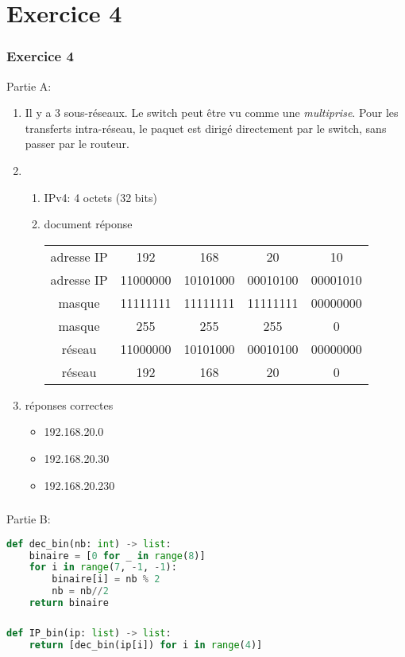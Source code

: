 \documentclass[svgnames,11pt]{beamer}
\begin{document}
\section{Exercice 4}
\begin{frame}
    \frametitle{Exercice 4}
Partie A:
\begin{enumerate}
    \item Il y a 3 sous-réseaux. Le switch peut être vu comme une \emph{multiprise}. Pour les transferts intra-réseau, le paquet est dirigé directement par le switch, sans passer par le routeur. 
    \item \begin{enumerate}
        \item IPv4: 4 octets (32 bits)
        \item document réponse
        \begin{center}
            \begin{tabular}{ccccc}
                adresse IP & 192      & 168      & 20       & 10        \\
                adresse IP & 11000000 & 10101000 & 00010100 & 00001010 \\
                masque     & 11111111 & 11111111 & 11111111 & 00000000 \\
                masque &255&255&255&0\\
                réseau     & 11000000 & 10101000 & 00010100 & 00000000 \\
                réseau&192&168&20&0\\
                
            \end{tabular}
        \end{center}
    \end{enumerate}
    \item réponses correctes
    \begin{itemize}
        \item 192.168.20.0
        \item 192.168.20.30
        \item 192.168.20.230
    \end{itemize}
\end{enumerate}
    

\end{frame}
\begin{frame}[fragile]
    \frametitle{}

Partie B:
\begin{center}
\begin{lstlisting}[language=Python , basicstyle=\ttfamily\small, xleftmargin=2em, xrightmargin=2em]
def dec_bin(nb: int) -> list:
    binaire = [0 for _ in range(8)]
    for i in range(7, -1, -1):
        binaire[i] = nb % 2
        nb = nb//2
    return binaire
\end{lstlisting}
\end{center}
\end{frame}
\begin{frame}[fragile]
    \frametitle{}


\begin{center}
\begin{lstlisting}[language=Python , basicstyle=\ttfamily\small, xleftmargin=2em, xrightmargin=2em]
def IP_bin(ip: list) -> list:
    return [dec_bin(ip[i]) for i in range(4)]
\end{lstlisting}
\end{center}
\end{frame}
\end{document}
